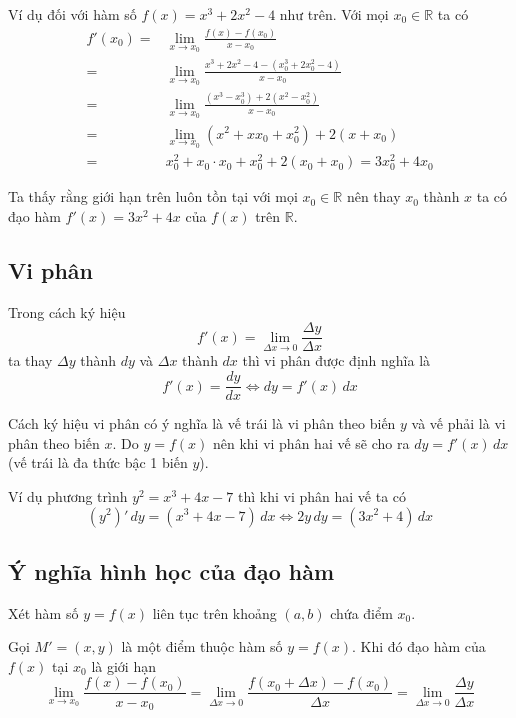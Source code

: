 Ví dụ đối với hàm số $f(x) = x^3 + 2x^2 - 4$ như trên. Với mọi $x_0 \in \mathbb{R}$ ta có
\begin{align*}
	f'(x_0) = & \lim_{x \to x_0} \frac{f(x) - f(x_0)}{x - x_0} \\ = & \lim_{x \to x_0} \frac{x^3 + 2x^2 - 4 - (x_0^3 + 2x_0^2 - 4)}{x - x_0} \\ = & \lim_{x \to x_0} \frac{(x^3 - x_0^3) + 2 (x^2 - x_0^2)}{x - x_0} \\ = & \lim_{x \to x_0} (x^2 + x x_0 + x_0^2) + 2 (x + x_0) \\ = & x_0^2 + x_0 \cdot x_0 + x_0^2 + 2 (x_0 + x_0) = 3x_0^2 + 4 x_0
\end{align*}

Ta thấy rằng giới hạn trên luôn tồn tại với mọi $x_0 \in \mathbb{R}$ nên thay $x_0$ thành $x$ ta có đạo hàm $f'(x) = 3x^2 + 4x$ của $f(x)$ trên $\mathbb{R}$.

\subsection*{Vi phân}

Trong cách ký hiệu \[f'(x) = \lim_{\Delta x \to 0} \frac{\Delta y}{\Delta x}\] ta thay $\Delta y$ thành $dy$ và $\Delta x$ thành $dx$ thì vi phân được định nghĩa là 
\begin{equation}
	f'(x) = \frac{dy}{dx} \Leftrightarrow dy = f'(x)\, dx
\end{equation}

Cách ký hiệu vi phân có ý nghĩa là vế trái là vi phân theo biến $y$ và vế phải là vi phân theo biến $x$. Do $y = f(x)$ nên khi vi phân hai vế sẽ cho ra $dy = f'(x)\, dx$ (vế trái là đa thức bậc 1 biến $y$).

Ví dụ phương trình $y^2 = x^3 + 4x - 7$ thì khi vi phân hai vế ta có \[(y^2)' \, dy = (x^3 + 4x - 7) \, dx \Leftrightarrow 2y \, dy = (3x^2 + 4) \, dx\]

\subsection*{Ý nghĩa hình học của đạo hàm}

Xét hàm số $y = f(x)$ liên tục trên khoảng $(a, b)$ chứa điểm $x_0$.

Gọi $M' = (x, y)$ là một điểm thuộc hàm số $y = f(x)$. Khi đó đạo hàm của $f(x)$ tại $x_0$ là giới hạn  \[\lim_{x \to x_0} \frac{f(x) - f(x_0)}{x - x_0} = \lim_{\Delta x \to 0} \frac{f(x_0 + \Delta x) - f(x_0)}{\Delta x} = \lim_{\Delta x \to 0} \frac{\Delta y}{\Delta x}\]

